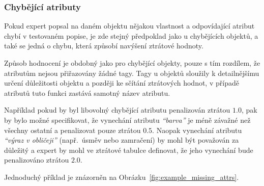 \newpage
\subsubsection{Chybějící atributy}
Pokud expert popsal na daném objektu nějakou vlastnost a odpovídající atribut chybí v testovaném popise,
je zde stejný předpoklad jako u chybějících objektů, a také se jedná o chybu, která způsobí navýšení ztrátové hodnoty.

Způsob hodnocení je obdobný jako pro chybějící objekty, pouze s tím rozdílem, že atributům nejsou přiřazovány žádné tagy.
Tagy u objektů sloužily k detailnějšímu určení důležitosti objektu a později ke sčítání ztrátových hodnot,
v případě atributů tuto funkci zastává samotný název atributu.

Například pokud by byl libovolný chybějící atributu penalizován ztrátou $1.0$, pak by bylo možné
specifikovat, že vynechání atributu \emph{\enquote{barva}} je méně závažné než všechny ostatní a penalizovat pouze ztrátou $0.5$.
Naopak vynechání atributu \emph{\enquote{výraz v obličeji}} (např.~úsměv nebo zamračení) by mohl být považován za důležitý a expert by
mohl ve ztrátové tabulce definovat, že jeho vynechání bude penalizováno ztrátou $2.0$.

Jednoduchý příklad je znázorněn na Obrázku~\ref{fig:example_missing_attrs}.

